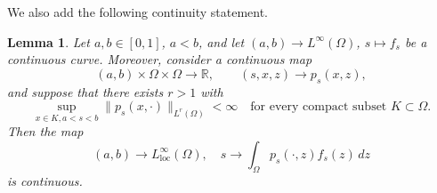 \documentclass[notitlepage,11pt,reqno]{amsart}
\newtheorem{lemma}[theorem]{Lemma}
\theoremstyle{definition}
\numberwithin{equation}{section}
\newcommand{\loc}{\mathrm{loc}}
\newcommand{\R}{\mathds{R}}
\begin{document}
We also add the following continuity statement. 


\begin{lemma}\label{lemma:continuity-general}
  Let $a,b \in [0,1]$, $a<b$, and let $(a,b)\to L^{\infty}(\Omega)$, $s\mapsto f_s$ be a continuous curve. Moreover, consider a continuous map
  $$
  (a,b) \times \Omega \times \Omega \to \R, \qquad (s,x,z) \to p_s(x,z),
  $$
and suppose that there exists $r>1$ with
  \begin{equation}
    \label{lemma:continuity-general-add-0}
\sup_{x \in K, a<s<b} \|p_s(x,\cdot)\|_{L^r(\Omega)}< \infty \quad \text{for every compact subset $K \subset \Omega$.}
\end{equation}
Then the map
$$
(a,b)\to L^{\infty}_{\loc}(\Omega),\quad s \to \int_{\Omega} p_s(\cdot,z)f_s(z)\,dz
$$
is continuous.    
\end{lemma}
\end{document}

